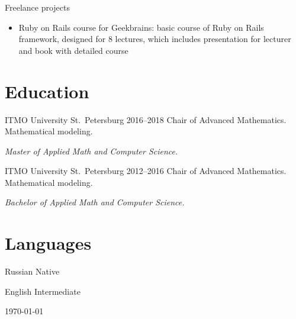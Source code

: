 \documentclass{cv}
\begin{document}
\vspace{2em}

\begin{cvblock}{Freelance projects}
  \begin{itemize}
    \item Ruby on Rails course for Geekbrains:
      basic course of Ruby on Rails framework, designed for 8 lectures, which
      includes presentation for lecturer and book with detailed course
  \end{itemize}
\end{cvblock}

\section{Education}

\begin{cvblock}{%
  \blocktitle
    {ITMO University}
    {St.~Petersburg}
    {}
    {2016--2018}}
  Chair of Advanced Mathematics. Mathematical modeling.
  \vspace{1em}

  \textit{Master of Applied Math and Computer Science.}
\end{cvblock}

\begin{cvblock}{%
  \blocktitle
    {ITMO University}
    {St.~Petersburg}
    {}
    {2012--2016}}
  Chair of Advanced Mathematics. Mathematical modeling.
  \vspace{1em}

  \textit{Bachelor of Applied Math and Computer Science.}
\end{cvblock}

\section{Languages}

\begin{cvblock}{Russian}
  Native
\end{cvblock}

\begin{cvblock}{English}
  Intermediate
\end{cvblock}

\vfill
\begin{center}
  \monthyear\today
\end{center}
\end{document}
